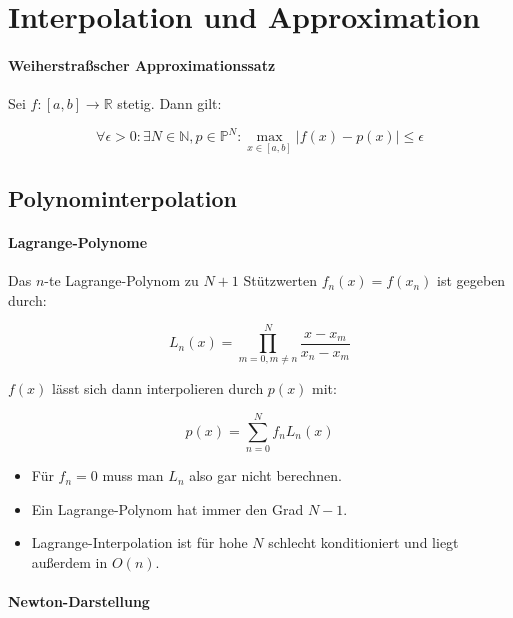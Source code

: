 \documentclass[a4paper, 14pt]{article}
\begin{document}
	\section{Interpolation und Approximation}

	\paragraph{Weiherstraßscher Approximationssatz}

	Sei $f : [a, b] \to \mathbb{R}$ stetig. Dann gilt:

	\begin{equation}
		\forall \epsilon > 0 : \exists N \in \mathbb{N}, p \in \mathbb{P}^N : \max_{x \in [a, b]}{|f(x) - p(x)|} \leq \epsilon
	\end{equation}

	\subsection{Polynominterpolation}

	\paragraph{Lagrange-Polynome} Das $n$-te Lagrange-Polynom zu $N + 1$ Stützwerten $f_n(x) = f(x_n)$ ist gegeben durch:

	\begin{equation}
		L_n(x) = \prod_{m = 0,m \neq n}^{N}{\frac{x - x_m}{x_n - x_m}}
	\end{equation}

	$f(x)$ lässt sich dann interpolieren durch $p(x)$ mit:

	\begin{equation}
		p(x) = \sum_{n = 0}^{N}{f_n L_n(x)}
	\end{equation}

	\begin{itemize}
		\item Für $f_n = 0$ muss man $L_n$ also gar nicht berechnen.
		\item Ein Lagrange-Polynom hat immer den Grad $N - 1$.
		\item Lagrange-Interpolation ist für hohe $N$ schlecht konditioniert und liegt außerdem in $O(n)$.
	\end{itemize}

	\paragraph{Newton-Darstellung}
\end{document}

